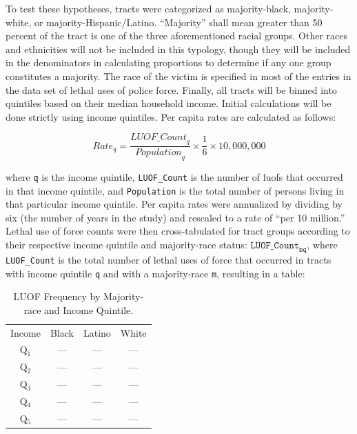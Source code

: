 \documentclass[12pt]{article}
\begin{document}
\vspace{12pt}

To test these hypotheses, tracts were categorized as majority-black, majority-white, or majority-Hispanic/Latino. “Majority” shall mean greater than 50 percent of the tract is one of the three aforementioned racial groups. Other races and ethnicities will not be included in this typology, though they will be included in the denominators in calculating proportions to determine if any one group constitutes a majority. The race of the victim is specified in most of the entries in the data set of lethal uses of police force. Finally, all tracts will be binned into quintiles based on their median household income. Initial calculations will be done strictly using income quintiles. Per capita rates are calculated as follows:

\begin{equation}
{Rate}_q=\frac{{LUOF\_Count}_q}{{Population}_q}\times\frac{1}{6}\times10,000,000
\label{eq:quintile_rate}
\end{equation}

\noindent{}where \texttt{q} is the income quintile, \texttt{LUOF\_Count} is the number of \acrshort{luof}s that occurred in that income quintile, and \texttt{Population} is the total number of persons living in that particular income quintile. Per capita rates were annualized by dividing by six (the number of years in the study) and rescaled to a rate of “per 10 million.” Lethal use of force counts were then cross-tabulated for tract groups according to their respective income quintile and majority-race status: $\texttt{LUOF\_Count}_\texttt{mq}$, where \texttt{LUOF\_Count} is the total number of lethal uses of force that occurred in tracts with income quintile \texttt{q} and with a majority-race \texttt{m}, resulting in a table:

\begin{table}[h]
\centering
\begin{tabular}{cccc} %
Income&Black&Latino&White\\
Q$_1$ &---&---&---\\
Q$_2$ &---&---&---\\
Q$_3$ &---&---&---\\
Q$_4$ &---&---&---\\
Q$_5$ &---&---&---\\
\end{tabular}
  \captionsetup{justification=centering, singlelinecheck=false, margin=2cm}
  \caption[LUOF Frequency: Majority-race and Income Quintile]{LUOF Frequency by Majority-race and Income Quintile.}
  \label{tab:luof_freq_majority_quintile}
\end{table}
\end{document}
